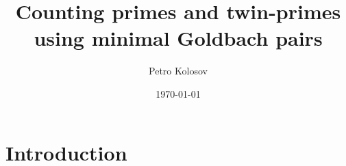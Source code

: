 \documentclass[12pt,letterpaper,oneside,reqno]{amsart}
\title[Counting primes and twin-primes using minimal Goldbach pairs]
{Counting primes and twin-primes using minimal Goldbach pairs}
\author[Petro Kolosov]{Petro Kolosov}
\date{\today}
\let\svthefootnote\thefootnote
\newcommand\freefootnote[1]{%
    \let\thefootnote\relax%
    \footnotetext{#1}%
    \let\thefootnote\svthefootnote%
}
\numberwithin{equation}{section}
\begin{document}
    \begin{abstract}
        
    \end{abstract}

    \maketitle

    \tableofcontents


    \section{Introduction} \label{sec:introduction}
    


    
    
\end{document}
